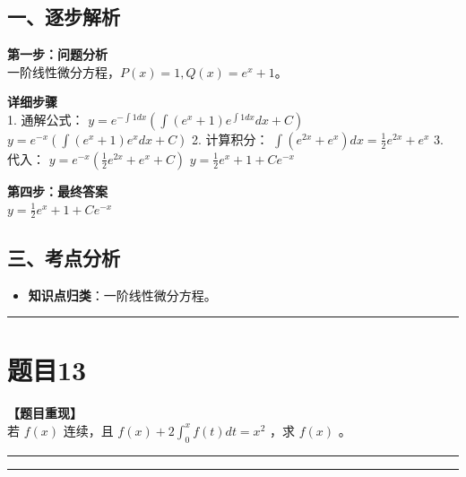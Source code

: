 \documentclass[12pt, a4paper]{ctexart}
\newcommand{\TopSeparator}{
    \par\noindent\rule{\textwidth}{1.5pt}\vspace{0.5em} %
}
\newcommand{\AnalysisSeparator}{
    \par\noindent\rule{\textwidth}{0.5pt}\vspace{0.2em}\hrule\vspace{0.5em} %
}
\newenvironment{RedAnalysis}{
    \par
    \color{red} %
}{
    \par
    \color{black} %
}
\begin{document}
\begin{RedAnalysis}

\subsection*{一、逐步解析}

\textbf{第一步：问题分析} \\
一阶线性微分方程，$P(x)=1, Q(x)=e^x+1$。

\textbf{详细步骤} \\
1. 通解公式：
   $y = e^{-\int 1 dx} (\int (e^x+1) e^{\int 1 dx} dx + C)$
   $y = e^{-x} (\int (e^x+1) e^x dx + C)$
2. 计算积分：
   $\int (e^{2x} + e^x) dx = \frac{1}{2}e^{2x} + e^x$
3. 代入：
   $y = e^{-x} (\frac{1}{2}e^{2x} + e^x + C)$
   $y = \frac{1}{2}e^x + 1 + Ce^{-x}$

\textbf{第四步：最终答案} \\
$ y = \frac{1}{2}e^x + 1 + Ce^{-x} $

\subsection*{三、考点分析}
\begin{itemize}
    \item \textbf{知识点归类}：一阶线性微分方程。
\end{itemize}

\end{RedAnalysis}

\vspace{2em}

\TopSeparator
\section*{题目13}

\textbf{【题目重现】} \\
若 $ f(x) $ 连续，且 $ f(x) + 2 \int_{0}^{x} f(t) dt = x^{2} $ ，求 $ f(x) $ 。

\AnalysisSeparator
\end{document}
